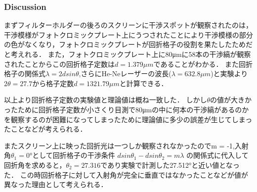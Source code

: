 \documentclass[11pt, a4paper]{jsarticle}
\begin{document}
\subsubsection{Discussion}
まずフィルターホルダーの後ろのスクリーンに干渉スポットが観察されたのは，干渉模様がフォトクロミックプレート上にうつされたことにより干渉模様の部分の色がなくなり，フォトクロミックプレートが回折格子の役割を果たしたためだと考えれる．
また，フォトクロミックプレート上に80μmに58本の干渉縞が観察されたことからこの回折格子定数は$d = 1.379μm$であることがわかる．
また回折格子の関係式$\lambda = 2dsin\theta$,さらにHe-Neレーザーの波長($\lambda = 632.8\mu m$)と実験より$2 \theta = 27.7$から格子定数$d =1321.79μm$と計算できる．

以上より回折格子定数の実験値と理論値は概ね一致した．
しかし$\theta$の値が大きかったために回折格子定数が小さくり目測で80μmの中に何本の干渉縞があるのかを観察するのが困難になってしまったために理論値に多少の誤差が生じてしまったことなどが考えられる．

またスクリーン上に映った回折光は一つしか観察されなかったのでm = -1,入射角$\theta_1 = 0°$として回折格子の干渉条件
$dsin\theta_1 - dsin\theta_2 = m\lambda$ の関係式に代入して回折角を求めると，$\theta_2 = 27.316$であり実験で計測した27.512°と近い値となった．
この時回折格子に対して入射角が完全に垂直ではなかったことなどが値が異なった理由として考えられる．
\newpage
\end{document}
